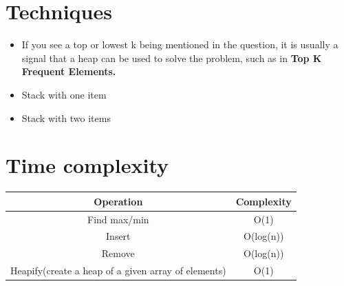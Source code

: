 		
		\section{Techniques}
		\begin{itemize}
			\item If you see a top or lowest k being mentioned in the question, it is usually a signal that a heap can be used to solve the problem, such as in \textbf{Top K Frequent Elements.}
			\item Stack with one item
			\item Stack with two items
		\end{itemize}
		
	
	\section{Time complexity}
	
	\begin{center}
		\begin{tabular}{||c c||}
		\hline
		Operation & Complexity\\
		\hline\hline
		Find max/min & O(1)\\
		\hline
		Insert & O(log(n))\\
		\hline
		Remove & O(log(n))\\
		\hline
		Heapify(create a heap of a given array of elements) & O(1)\\
		\hline
			
		\end{tabular}
	\end{center}
	
	
	
